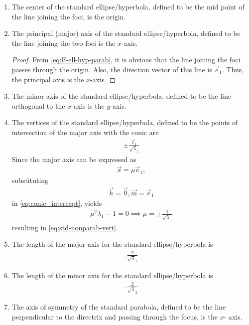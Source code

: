 \begin{enumerate}[label=\thesection.\arabic*.,ref=\thesection.\theenumi]
	\item
			\label{corr:center}
			The center of the standard ellipse/hyperbola, defined to be the mid point of the line joining the foci, is the origin.
	
	\item
		\label{corr:axis}
			The principal (major) axis of the standard ellipse/hyperbola, defined to be the line joining the two foci   is the $x$-axis.  
	\begin{proof}
		From 	\eqref{eq:F-ell-hyp-parab}, it is obvious that the line joining the foci passes through the origin.  Also, the direction vector of this line is $\vec{e}_1$.  Thus, the principal axis is the $x$-axis. 
	\end{proof}
	\item
		\label{corr:minor-axis}
			The minor axis of the standard ellipse/hyperbola, defined to be the line orthogonal to the $x$-axis is the $y$-axis. 
\item The vertices of the standard ellipse/hyperbola, defined to be the points of intersection of the major axis with the conic are
\begin{align}
 \pm \frac{\vec{e}_1}{\sqrt{\lambda}_1}
	\label{eq:std-nonparab-vert}
\end{align}
		\solution Since the 
major axis can be expressed as
\begin{align}
	\vec{x} = {\mu} \vec{e}_1,
\end{align}
substituting
\begin{align}
\vec{h} = \vec{0}, \vec{m} = \vec{e}_1
\end{align}
in
\eqref{eq:conic_intercept},
yields
\begin{align}
	\mu^2\lambda_1  - 1 = 0 \implies \mu = \pm \frac{1}{\sqrt{\lambda}_1}
\end{align}
%
resulting in 
	\eqref{eq:std-nonparab-vert}.
\item The length of the major axis for the standard ellipse/hyperbola is 
\begin{align}
	\label{eq:std-nonparab-major-len}.
	\frac{2}{\sqrt{\lambda}_1}
\end{align}
\item The length of the minor axis for the standard ellipse/hyperbola is 
\begin{align}
	\label{eq:std-nonparab-minor-len}.
	\frac{2}{\sqrt{\lambda}_2}
\end{align}
	\item
			The axis of symmetry of the standard parabola, defined to be the line perpendicular to the directrix and passing through the focus,  is the $x$- axis.
	

\end{enumerate}
